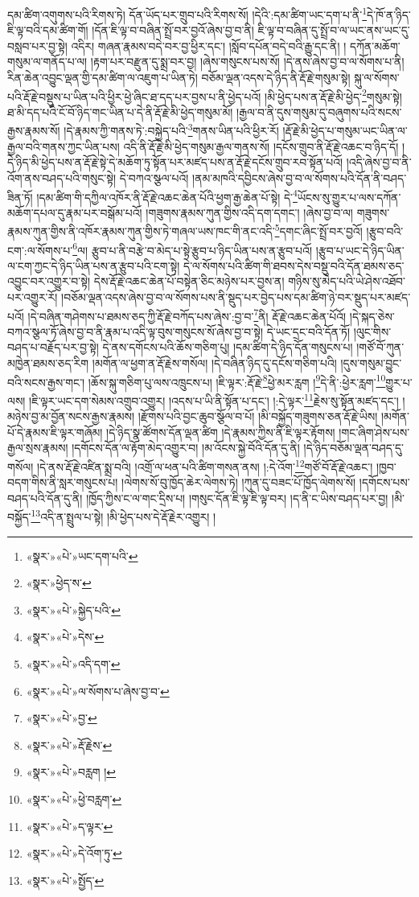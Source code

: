 དམ་ཚིག་འགུགས་པའི་རིགས་ཏེ། དོན་ཡོད་པར་གྲུབ་པའི་རིགས་སོ། །དེའི་:དམ་ཚིག་ཡང་དག་པ་ནི་\footnote{«སྣར་»«པེ་»ཡང་དག་པའི་}དེ་ཁོ་ན་ཉིད་ཇི་ལྟ་བའི་དམ་ཚིག་གོ། །དོན་ཇི་ལྟ་བ་བཞིན་སྤྲོ་བར་བྱའོ་ཞེས་བྱ་བ་ནི། ཇི་ལྟ་བ་བཞིན་དུ་སྤྲོ་བ་ལ་ཡང་ནས་ཡང་དུ་བསླབ་པར་བྱ་སྟེ། འདིར། གཞན་རྣམས་བདེ་བར་བྱ་ཕྱིར་དང་། །སློབ་དཔོན་བདེ་བའི་རྒྱུ་དང་ནི། །
དཀོན་མཆོག་གསུམ་ལ་གནོད་པ་ལ། །རྟག་པར་བརྫུན་དུ་སྨྲ་བར་བྱ། །ཞེས་གསུངས་པས་སོ། །དེ་ནས་ཞེས་བྱ་བ་ལ་སོགས་པ་ནི། རིན་ཆེན་འབྱུང་ལྡན་གྱི་དམ་ཚིག་ལ་འཇུག་པ་ཡིན་ཏེ། བཅོམ་ལྡན་འདས་དེ་ཉིད་ནི་རྡོ་རྗེ་གསུམ་སྟེ། སྐུ་ལ་སོགས་པའི་རྡོ་རྗེ་བསྡུས་པ་ཡིན་པའི་ཕྱིར་ཕྱེ་ཞིང་ཐ་དད་པར་བྱས་པ་ནི་ཕྱེད་པའོ། །མི་ཕྱེད་པས་ན་རྡོ་རྗེ་མི་ཕྱེད་\footnote{«སྣར་»ཕྱེད་ས་}གསུམ་སྟེ། ཐ་མི་དད་པའི་ངོ་བོ་ཉིད་གང་ཡིན་པ་དེ་ནི་རྡོ་རྗེ་མི་ཕྱེད་གསུམ་མོ། །རྒྱལ་བ་ནི་དུས་གསུམ་དུ་བཞུགས་པའི་སངས་རྒྱས་རྣམས་སོ། །དེ་རྣམས་ཀྱི་གནས་ཏེ་:བསྐྱེད་པའི་\footnote{«སྣར་»«པེ་»སྐྱེད་པའི་}གནས་ཡིན་པའི་ཕྱིར་རོ། །རྡོ་རྗེ་མི་ཕྱེད་པ་གསུམ་ཡང་ཡིན་ལ་རྒྱལ་བའི་གནས་ཀྱང་ཡིན་པས། འདི་ནི་རྡོ་རྗེ་མི་ཕྱེད་གསུམ་རྒྱལ་གནས་སོ། །དངོས་གྲུབ་ནི་རྡོ་རྗེ་འཆང་བ་ཉིད་དོ། །དེ་ཉིད་མི་ཕྱེད་པས་ན་རྡོ་རྗེ་སྟེ་དེ་མཆོག་ཏུ་སྟོན་པར་མཛད་པས་ན་རྡོ་རྗེ་དངོས་གྲུབ་རབ་སྟོན་པའོ། །འདི་ཞེས་བྱ་བ་ནི་འོག་ནས་བཤད་པའི་གསུང་སྟེ། དེ་བཀའ་སྩལ་པའོ། །ནམ་མཁའི་དབྱིངས་ཞེས་བྱ་བ་ལ་སོགས་པའི་དོན་ནི་བཤད་ཟིན་ཏོ། །དམ་ཚིག་གི་དཀྱིལ་འཁོར་ནི་རྡོ་རྗེ་འཆང་ཆེན་པོའི་ཕྱག་རྒྱ་ཆེན་པོ་སྟེ། དེ་\footnote{«སྣར་»«པེ་»དེས་}ཡོངས་སུ་གྱུར་པ་ལས་དཀོན་མཆོག་དཔལ་དུ་རྣམ་པར་བསྒོམ་པའོ། །གཟུགས་རྣམས་ཀུན་གྱིས་འདི་དག་དགང་། །ཞེས་བྱ་བ་ལ། གཟུགས་རྣམས་ཀུན་གྱིས་ནི་འཁོར་རྣམས་ཀུན་གྱིས་ཏེ་གཞལ་ཡས་ཁང་གི་ནང་འདི་\footnote{«སྣར་»«པེ་»འདི་དག་}དགང་ཞིང་སྤྲོ་བར་བྱའོ། །རྩུབ་བའི་ངག་:ལ་སོགས་པ་\footnote{«སྣར་»«པེ་»ལ་སོགས་པ་ཞེས་བྱ་བ་}ལ། རྩུབ་པ་ནི་བརྩེ་བ་མེད་པ་སྟེ་རྩུབ་པ་ཉིད་ཡིན་པས་ན་རྩུབ་པའོ། །རྩུབ་པ་ཡང་དེ་ཉིད་ཡིན་ལ་ངག་ཀྱང་དེ་ཉིད་ཡིན་པས་ན་རྩུབ་པའི་ངག་སྟེ། དེ་ལ་སོགས་པའི་ཚིག་གི་ཐབས་དེས་བསྡུ་བའི་དོན་ཐམས་ཅད་འབྱུང་བར་འགྱུར་བ་སྟེ། དེས་རྡོ་རྗེ་འཆང་ཆེན་པོ་བསྟེན་ཅིང་མཉེས་པར་བྱས་ན། གཉིས་སུ་མེད་པའི་ཡེ་ཤེས་འཐོབ་པར་འགྱུར་རོ། །བཅོམ་ལྡན་འདས་ཞེས་བྱ་བ་ལ་སོགས་པས་ནི་སྡུད་པར་བྱེད་པས་དམ་ཚིག་ཉེ་བར་སྡུད་པར་མཛད་པའོ། །དེ་བཞིན་གཤེགས་པ་ཐམས་ཅད་ཀྱི་རྡོ་རྗེ་བཀོད་པས་ཞེས་:བྱ་བ་\footnote{«སྣར་»«པེ་»བྱ་}ནི། རྡོ་རྗེ་འཆང་ཆེན་པོའོ། །དེ་སྐད་ཅེས་བཀའ་སྩལ་ཏོ་ཞེས་བྱ་བ་ནི་རྣམ་པ་འདི་ལྟ་བུས་གསུངས་སོ་ཞེས་བྱ་བ་སྟེ། དེ་ཡང་དྲང་བའི་དོན་ཏོ། །ལུང་གིས་བཤད་པ་བརྗོད་པར་བྱ་སྟེ། དེ་ནས་དགོངས་པའི་ཆོས་གཅིག་པུ། །དམ་ཚིག་དེ་ཉིད་དོན་གསུངས་པ། །གཙོ་བོ་ཀུན་མཁྱེན་ཐམས་ཅད་རིག །མགོན་ལ་ཕྱག་ན་རྡོ་རྗེས་གསོལ། །དེ་བཞིན་ཉིད་དུ་དངོས་གཅིག་པའི། །དུས་གསུམ་བྱུང་བའི་སངས་རྒྱས་གང་། །ཆོས་སྐུ་གཅིག་པུ་ལས་འཁྲུངས་པ། །ཇི་ལྟར་:རྡོ་རྗེ་\footnote{«སྣར་»«པེ་»རྡོ་རྗེས་}ཕྱེ་མར་རླག །\footnote{«སྣར་»«པེ་»བརླག །}དེ་ནི་:ཕྱེར་རླག་\footnote{«སྣར་»«པེ་»ཕྱེ་བརླག་}གྱུར་པ་ལས། །ཇི་ལྟར་ཡང་དག་སེམས་འགྲུབ་འགྱུར། །འདས་པ་ཡི་ནི་སྟོན་པ་དང་། །:དེ་ལྟར་\footnote{«སྣར་»«པེ་»ད་ལྟར་}རྗེས་སུ་སྟོན་མཛད་དང་། །མཉེས་བྱ་མ་བྱོན་སངས་རྒྱས་རྣམས། །རྫོགས་པའི་བྱང་ཆུབ་སྩོལ་བ་པོ། །མི་བསྐྱོད་གཟུགས་ཅན་རྡོ་རྗེ་ཡིས། །མགོན་པོ་དེ་རྣམས་ཇི་ལྟར་གཞོམ། །དེ་ཉིད་སྣ་ཚོགས་དོན་ལྡན་ཚིག །དེ་རྣམས་ཀྱིས་ནི་ཇི་ལྟར་རྟོགས། །གང་ཞིག་ཤེས་པས་རྒྱལ་སྲས་རྣམས། །དགོངས་དོན་ལ་རྟོག་མེད་འགྱུར་བ། །མ་འོངས་སྐྱེ་བོའི་དོན་དུ་ནི། །དེ་ཉིད་བཅོམ་ལྡན་བཤད་དུ་གསོལ། །དེ་ནས་རྡོ་རྗེ་འཛིན་སྨྲ་བའི། །འགྲོ་ལ་ཕན་པའི་ཚིག་གསན་ནས། །:དེ་འོག་\footnote{«སྣར་»«པེ་»དེ་འོག་ཏུ་}གཙོ་བོ་རྡོ་རྗེ་འཆང་། །ཁྱབ་བདག་གིས་ནི་སླར་གསུངས་པ། །ལེགས་སོ་བུ་ཁྱོད་ཆེར་ལེགས་ཏེ། །ཀུན་དུ་བཟང་པོ་ཁྱོད་ལེགས་སོ། །དགོངས་པས་བཤད་པའི་དོན་དུ་ནི། །ཁྱོད་ཀྱིས་ང་ལ་གང་དྲིས་པ། །གསུང་དོན་ཇི་ལྟ་ཇི་ལྟ་བར། །ད་ནི་ང་ཡིས་བཤད་པར་བྱ། །མི་བསྐྱོད་\footnote{«སྣར་»«པེ་»སྤྱོད་}འདི་ན་སྤྲུལ་པ་སྟེ། །མི་ཕྱེད་པས་དེ་རྡོ་རྗེར་འགྱུར། །
